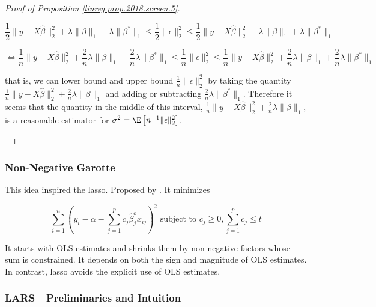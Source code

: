\begin{proof}[Proof of Proposition \ref{linreg.prop.2018.screen.5}]
\begin{enumerate}[(a)]
\begin{enumerate}[(i)]
\[
\frac{1}{2} \lVert y - X \hat{\beta} \rVert_2^2 + \lambda \lVert \beta \rVert_1 - \lambda \lVert \beta^* \rVert_1  \leq \frac{1}{2} \lVert \epsilon \rVert_2^2 \leq  \frac{1}{2} \lVert y - X \hat{\beta} \rVert_2^2 + \lambda \lVert \beta \rVert_1 + \lambda \lVert \beta^* \rVert_1 
\]

\[
\iff \frac{1}{n} \lVert y - X \hat{\beta} \rVert_2^2 + \frac{2}{n} \lambda \lVert \beta \rVert_1 - \frac{2}{n}\lambda \lVert \beta^* \rVert_1  \leq \frac{1}{n} \lVert \epsilon \rVert_2^2 \leq  \frac{1}{n} \lVert y - X \hat{\beta} \rVert_2^2 + \frac{2}{n}\lambda \lVert \beta \rVert_1 +\frac{2}{n} \lambda \lVert \beta^* \rVert_1 
\]

that is, we can lower bound and upper bound \(\frac{1}{n} \lVert \epsilon \rVert_2^2 \) by taking the quantity \(\frac{1}{n} \lVert y - X \hat{\beta} \rVert_2^2 + \frac{2}{n} \lambda \lVert \beta \rVert_1\) and adding or subtracting \(\frac{2}{n}\lambda \lVert \beta^* \rVert_1\). Therefore it seems that the quantity in the middle of this interval,  \(\frac{1}{n} \lVert y - X \hat{\beta} \rVert_2^2 + \frac{2}{n} \lambda \lVert \beta \rVert_1\), is a reasonable estimator for \(\sigma^2 = \E \left[ n^{-1} \lVert \epsilon \rVert_2^2 \right]\).

\end{enumerate}

\end{enumerate}

\end{proof}



\subsubsection{Non-Negative Garotte}

This idea inspired the lasso. Proposed by \citet{Breiman1995}. It minimizes

\[
\sum_{i=1}^n \left(y_i - \alpha - \sum_{j=1}^p c_j \hat{\beta}_j^o x_{ij} \right)^2 \text{ subject to } c_j \geq 0, \sum_{j=1}^p c_j \leq t
\]

It starts with OLS estimates and shrinks them by non-negative factors whose sum is constrained. It depends on both the sign and magnitude of OLS estimates. In contrast, lasso avoids the explicit use of OLS estimates.

\subsubsection{LARS---Preliminaries and Intuition}\label{lars.prelims}

